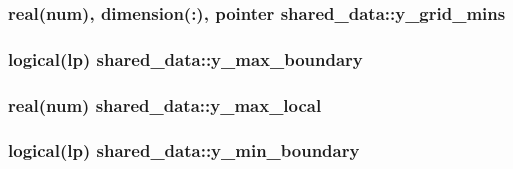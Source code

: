 \subsubsection[{\texorpdfstring{y\+\_\+grid\+\_\+mins}{y_grid_mins}}]{\setlength{\rightskip}{0pt plus 5cm}real(num), dimension(\+:), pointer shared\+\_\+data\+::y\+\_\+grid\+\_\+mins}\hypertarget{namespaceshared__data_a54dff3f43983b04af43c4eb2d91dea38}{}\label{namespaceshared__data_a54dff3f43983b04af43c4eb2d91dea38}
\subsubsection[{\texorpdfstring{y\+\_\+max\+\_\+boundary}{y_max_boundary}}]{\setlength{\rightskip}{0pt plus 5cm}logical(lp) shared\+\_\+data\+::y\+\_\+max\+\_\+boundary}\hypertarget{namespaceshared__data_a45584e39581808654dfb5aafe584b033}{}\label{namespaceshared__data_a45584e39581808654dfb5aafe584b033}
\subsubsection[{\texorpdfstring{y\+\_\+max\+\_\+local}{y_max_local}}]{\setlength{\rightskip}{0pt plus 5cm}real(num) shared\+\_\+data\+::y\+\_\+max\+\_\+local}\hypertarget{namespaceshared__data_a0fb4b2d73929a142db79b38b0fdf8545}{}\label{namespaceshared__data_a0fb4b2d73929a142db79b38b0fdf8545}
\subsubsection[{\texorpdfstring{y\+\_\+min\+\_\+boundary}{y_min_boundary}}]{\setlength{\rightskip}{0pt plus 5cm}logical(lp) shared\+\_\+data\+::y\+\_\+min\+\_\+boundary}\hypertarget{namespaceshared__data_ae92a066d51a02d4b4a60837c3033066d}{}\label{namespaceshared__data_ae92a066d51a02d4b4a60837c3033066d}
